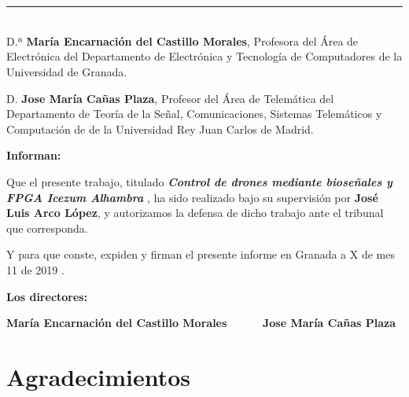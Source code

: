 \chapter*{}
\thispagestyle{empty}

\noindent\rule[-1ex]{\textwidth}{2pt}\\[4.5ex]

D.ª \textbf{ María Encarnación del Castillo Morales}, Profesora del Área de Electrónica del Departamento de Electrónica y Tecnología de Computadores de la Universidad de Granada.

\vspace{0.5cm}

D. \textbf{Jose María Cañas Plaza}, Profesor del Área de Telemática del Departamento de Teoría de la Señal, Comunicaciones, Sistemas Telemáticos y Computación de  de la Universidad Rey Juan Carlos de Madrid.


\vspace{0.5cm}

\textbf{Informan:}

\vspace{0.5cm}

Que el presente trabajo, titulado \textit{\textbf{Control de drones mediante bioseñales y FPGA Icezum Alhambra }},
ha sido realizado bajo su supervisión por \textbf{José Luis Arco López}, y autorizamos la defensa de dicho trabajo ante el tribunal
que corresponda.

\vspace{0.5cm}

Y para que conste, expiden y firman el presente informe en Granada a X de mes 11 de 2019 .

\vspace{1cm}

\textbf{Los directores:}

\vspace{5cm}

\noindent \textbf{María Encarnación del Castillo Morales \ \ \ \ \ Jose María Cañas Plaza}

\chapter*{Agradecimientos}
\thispagestyle{empty}

       \vspace{1cm}




